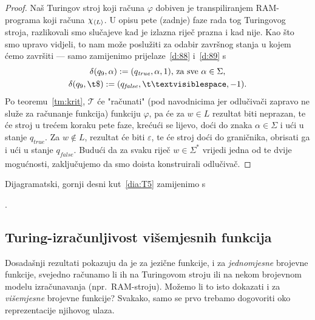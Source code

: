 \begin{proof}
Naš Turingov stroj koji računa $\varphi$ dobiven je transpiliranjem RAM-programa koji računa $\chi_{\langle L\rangle}$. U opisu pete (zadnje) faze rada tog Turingovog stroja, razlikovali smo slučajeve kad je izlazna riječ prazna i kad nije. Kao što smo upravo vidjeli, to nam može poslužiti za odabir završnog stanja u kojem ćemo završiti --- samo zamijenimo prijelaze~\eqref{d:88} i~\eqref{d:89} s
\begin{gather}
\label{eq:d88j}
    \delta(q_9,\alpha):=(q_\mathit{true},\alpha,1)\text{, za sve }\alpha\in\Sigma\text,\\
\label{eq:d89j}
    \delta(q_9,\t\$):=(q_\mathit{false},\bl,-1)\text.
\end{gather}
Po teoremu~\ref{tm:krit}, $\mathcal T$ će "računati" (pod navodnicima jer odlučivači zapravo ne služe za računanje funkcija) funkciju $\varphi$, pa će za $w\in L$ rezultat biti neprazan, te će stroj u trećem koraku pete faze, krećući se lijevo, doći do znaka $\alpha\in\Sigma$ i ući u stanje $q_\mathit{true}$. Za $w\not\in L$, rezultat će biti $\varepsilon$, te će stroj doći do graničnika, obrisati ga i ući u stanje $q_\mathit{false}$. Budući da za svaku riječ $w\in\Sigma^*$ vrijedi jedna od te dvije mogućnosti, zaključujemo da smo doista konstruirali odlučivač.
\end{proof}
\vspace{-4mm}

Dijagramatski, gornji desni kut~\eqref{dia:T5} zamijenimo s\quad {}\;.

\subsection{Turing-izračunljivost višemjesnih funkcija}

Dosadašnji rezultati pokazuju da je za jezične funkcije, i za \emph{jednomjesne} brojevne funkcije, svejedno računamo li ih na Turingovom stroju ili na nekom brojevnom modelu izračunavanja (npr.\ RAM-stroju). Možemo li to isto dokazati i za \emph{višemjesne} brojevne funkcije? Svakako, samo se prvo trebamo dogovoriti oko reprezentacije njihovog ulaza.

